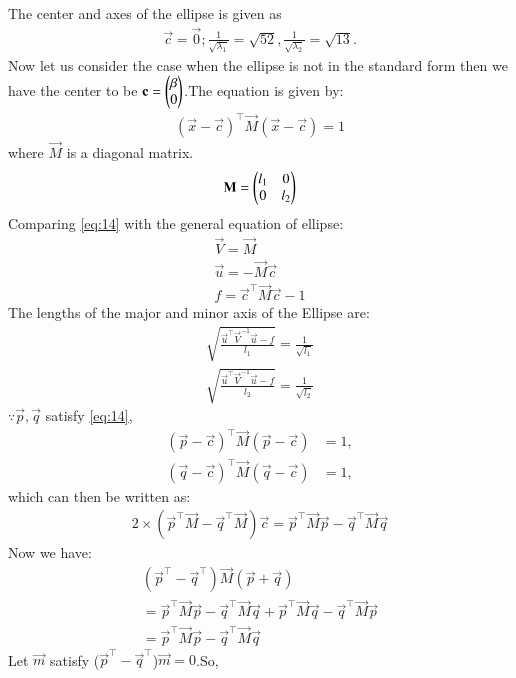 \documentclass[journal,12pt,twocolumn]{IEEEtran}
\begin{document}
The center and axes of the ellipse is given as
\begin{align}
\vec{c} = \vec{0};
\frac{1}{\sqrt{\lambda_1}}  = \sqrt{52},
\frac{1}{\sqrt{\lambda_2}} =\sqrt{13}.
\end{align}
Now let us consider the case when the ellipse is not in the standard form then we have the center to be $\mathbf{c}=\begin{pmatrix}\beta\\0\end{pmatrix}$.The equation is given by:
\begin{align}
(\vec{x}-\vec{c})^{\top}\vec{M}(\vec{x}-\vec{c})=1\label{eq:14}
\end{align}
where $\vec{M}$ is a diagonal matrix.
\begin{align}
    \mathbf{M}=\begin{pmatrix}l_1&0\\0&l_2\end{pmatrix}
\end{align}
Comparing \eqref{eq:14} with the general equation of ellipse:
\begin{align}
    \vec{V}=\vec{M}\\
    \vec{u}=-\vec{M}\vec{c}\\
    f=\vec{c}^{\top}\vec{M}\vec{c}-1
\end{align}
The lengths of the major and minor axis of the Ellipse are:
\begin{align}
    \sqrt{\frac{\vec{u}^{\top}\vec{V}^{-1}\vec{u}-f}{l_1}}=\frac{1}{\sqrt{l_1}}\\
    \sqrt{\frac{\vec{u}^{\top}\vec{V}^{-1}\vec{u}-f}{l_2}}=\frac{1}{\sqrt{l_2}}
\end{align}
$\because \vec{p}, \vec{q}$ satisfy \eqref{eq:14},
\begin{align}
\label{eq:ellipse_std_ab}
(\vec{p}-\vec{c})^{\top}\vec{M}(\vec{p}-\vec{c}) &= 1,
\\
(\vec{q}-\vec{c})^{\top}\vec{M}(\vec{q}-\vec{c}) &= 1,
\end{align}
which can then be written as:
\begin{align}
    2\times(\vec{p}^{\top}\vec{M}-\vec{q}^{\top}\vec{M})\vec{c}=\vec{p}^{\top}\vec{M}\vec{p}-\vec{q}^{\top}\vec{M}\vec{q}
\end{align}
Now we have:
\begin{align}
   (\vec{p}^{\top}-\vec{q}^{\top})\vec{M}(\vec{p}+\vec{q})\\
   =\vec{p}^{\top}\vec{M}\vec{p}-\vec{q}^{\top}\vec{M}\vec{q}+\vec{p}^{\top}\vec{M}\vec{q}-\vec{q}^{\top}\vec{M}\vec{p}\\
   =\vec{p}^{\top}\vec{M}\vec{p}-\vec{q}^{\top}\vec{M}\vec{q}
\end{align}
Let $\vec{m}$ satisfy ($\vec{p}^{\top}-\vec{q}^{\top}$)$\vec{m}=0$.So,
\end{document}
